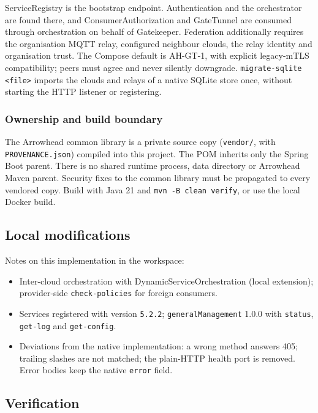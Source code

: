 \documentclass[a4paper]{arrowhead}
\begin{document}
ServiceRegistry is the bootstrap endpoint. Authentication and the orchestrator are found there, and ConsumerAuthorization and GateTunnel are consumed through orchestration on behalf of Gatekeeper. Federation additionally requires the organisation MQTT relay, configured neighbour clouds, the relay identity and organisation trust. The Compose default is AH-GT-1, with explicit legacy-mTLS compatibility; peers must agree and never silently downgrade. \texttt{migrate-\allowbreak{}sqlite <file>} imports the clouds and relays of a native SQLite store once, without starting the HTTP listener or registering.

\subsubsection{Ownership and build boundary}
The Arrowhead common library is a private source copy (\texttt{vendor/}, with \texttt{PROVENANCE.json}) compiled into this project. The POM inherits only the Spring Boot parent. There is no shared runtime process, data directory or Arrowhead Maven parent. Security fixes to the common library must be propagated to every vendored copy. Build with Java 21 and \texttt{mvn -\allowbreak{}B clean verify}, or use the local Docker build.

\subsection{Local modifications}
\label{sec:local}

Notes on this implementation in the workspace:
\begin{itemize}
  \item Inter-cloud orchestration with Dynamic\allowbreak{}Service\allowbreak{}Orchestration (local extension); provider-side \texttt{check-\allowbreak{}policies} for foreign consumers.
  \item Services registered with version \texttt{5.\allowbreak{}2.\allowbreak{}2}; \texttt{generalManagement} 1.0.0 with \texttt{status}, \texttt{get-\allowbreak{}log} and \texttt{get-\allowbreak{}config}.
  \item Deviations from the native implementation: a wrong method answers 405; trailing slashes are not matched; the plain-HTTP health port is removed. Error bodies keep the native \texttt{error} field.
\end{itemize}

\subsection{Verification}
\end{document}
